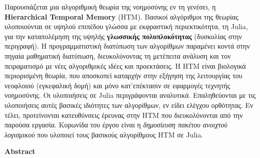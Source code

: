 \thispagestyle{empty}
\begin{center}
   \Large
   \textbf{\titlestring}

   \vspace{0.4cm}
   \large

   \vspace{0.4cm}
   \textbf{\authorstring}

   \vspace{0.9cm}
   \textbf{\abstractname}
\end{center}

    Παρουσιάζεται μια αλγοριθμική θεωρία της νοημοσύνης εν τη γενέσει, η \textbf{Hierarchical Temporal Memory} (HTM).
    Βασικοί αλγόριθμοι της θεωρίας υλοποιούνται σε υψηλού επιπέδου γλώσσα με εκφραστική περιεκτικότητα, τη Julia,
    για την καταπολέμηση της υψηλής \textbf{γλωσσικής πολυπλοκότητας} (δυσκολίας στην περιγραφή).
    Η προγραμματιστική διατύπωση των αλγορίθμων παραμένει κοντά στην πηγαία μαθηματική διατύπωση,
    διευκολύνοντας τη μετέπειτα ανάλυση και τον πειραματισμό με νέες αλγοριθμικές ιδέες και προεκτάσεις.
    Η HTM είναι βιολογικά περιορισμένη θεωρία, που αποσκοπεί καταρχήν στην εξήγηση της λειτουργίας του νεοφλοιού (εγκεφαλική δομή)
    και μόνο κατ'επέκτασιν σε εφαρμογές τεχνητής νοημοσύνης.
    Οι υλοποιήσεις σε Julia περιγράφονται αναλυτικά.
    Επαληθεύονται με τις υλοποιήσεις αυτές βασικές ιδιότητες των αλγορίθμων, εν είδει ελέγχου ορθότητας.
    Εν τέλει, προτείνονται κατευθύνσεις έρευνας στην HTM που διευκολύνονται από την παρούσα εργασία.
    Κορωνίδα του έργου είναι η \textit{δημοσίευση πακέτου ανοιχτού λογισμικού} που υλοποιεί τους βασικούς αλγορίθμους HTM σε Julia.

\begin{center}
    \large
    \vspace{2.9cm}
    \textbf{Abstract}
\end{center}

